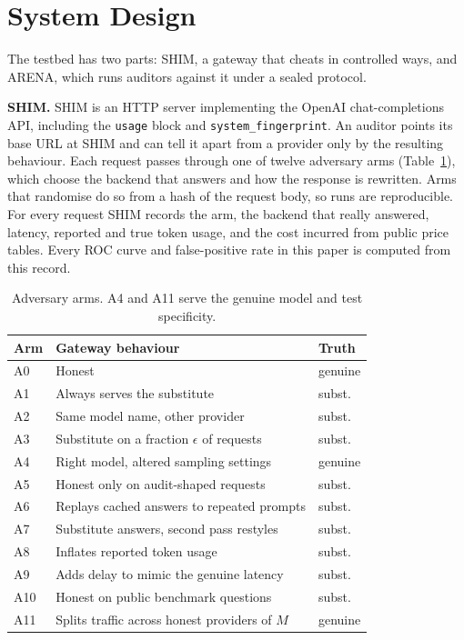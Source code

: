 \section{System Design}\label{sec:design}
The testbed has two parts: SHIM, a gateway that cheats in controlled ways, and ARENA, which runs
auditors against it under a sealed protocol.

\textbf{SHIM.} SHIM is an HTTP server implementing the OpenAI chat-completions API, including the
\texttt{usage} block and \texttt{system\_fingerprint}. An auditor points its base URL at SHIM and can
tell it apart from a provider only by the resulting behaviour. Each request passes through one of
twelve adversary arms (Table~\ref{tab:arms}), which choose the backend that answers and how the
response is rewritten. Arms that randomise do so from a hash of the request body, so runs are
reproducible. For every request SHIM records the arm, the backend that really
answered, latency, reported and true token usage, and the cost incurred from public price tables.
Every ROC curve and false-positive rate in this paper is computed from this record.

\begin{table}[t]
\centering
\caption{Adversary arms. A4 and A11 serve the genuine model and test specificity.}
\label{tab:arms}
\small
\begin{tabular}{@{}lll@{}}
\toprule
Arm & Gateway behaviour & Truth \\
\midrule
A0 & Honest & genuine \\
A1 & Always serves the substitute & subst. \\
A2 & Same model name, other provider & subst. \\
A3 & Substitute on a fraction $\epsilon$ of requests & subst. \\
A4 & Right model, altered sampling settings & genuine \\
A5 & Honest only on audit-shaped requests & subst. \\
A6 & Replays cached answers to repeated prompts & subst. \\
A7 & Substitute answers, second pass restyles & subst. \\
A8 & Inflates reported token usage & subst. \\
A9 & Adds delay to mimic the genuine latency & subst. \\
A10 & Honest on public benchmark questions & subst. \\
A11 & Splits traffic across honest providers of $M$ & genuine \\
\bottomrule
\end{tabular}
\end{table}

